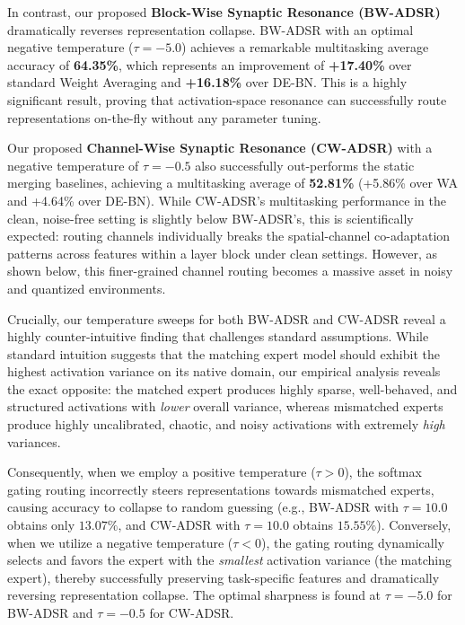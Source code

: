 \documentclass{article}
\theoremstyle{plain}
\theoremstyle{definition}
\theoremstyle{remark}
\begin{document}
In contrast, our proposed \textbf{Block-Wise Synaptic Resonance (BW-ADSR)} dramatically reverses representation collapse. BW-ADSR with an optimal negative temperature ($\tau = -5.0$) achieves a remarkable multitasking average accuracy of \textbf{64.35\%}, which represents an improvement of \textbf{+17.40\%} over standard Weight Averaging and \textbf{+16.18\%} over DE-BN. This is a highly significant result, proving that activation-space resonance can successfully route representations on-the-fly without any parameter tuning.

Our proposed \textbf{Channel-Wise Synaptic Resonance (CW-ADSR)} with a negative temperature of $\tau = -0.5$ also successfully out-performs the static merging baselines, achieving a multitasking average of \textbf{52.81\%} (+5.86\% over WA and +4.64\% over DE-BN). While CW-ADSR's multitasking performance in the clean, noise-free setting is slightly below BW-ADSR's, this is scientifically expected: routing channels individually breaks the spatial-channel co-adaptation patterns across features within a layer block under clean settings. However, as shown below, this finer-grained channel routing becomes a massive asset in noisy and quantized environments.

Crucially, our temperature sweeps for both BW-ADSR and CW-ADSR reveal a highly counter-intuitive finding that challenges standard assumptions. While standard intuition suggests that the matching expert model should exhibit the highest activation variance on its native domain, our empirical analysis reveals the exact opposite: the matched expert produces highly sparse, well-behaved, and structured activations with \emph{lower} overall variance, whereas mismatched experts produce highly uncalibrated, chaotic, and noisy activations with extremely \emph{high} variances.

Consequently, when we employ a positive temperature ($\tau > 0$), the softmax gating routing incorrectly steers representations towards mismatched experts, causing accuracy to collapse to random guessing (e.g., BW-ADSR with $\tau = 10.0$ obtains only $13.07\%$, and CW-ADSR with $\tau = 10.0$ obtains $15.55\%$). Conversely, when we utilize a negative temperature ($\tau < 0$), the gating routing dynamically selects and favors the expert with the \emph{smallest} activation variance (the matching expert), thereby successfully preserving task-specific features and dramatically reversing representation collapse. The optimal sharpness is found at $\tau = -5.0$ for BW-ADSR and $\tau = -0.5$ for CW-ADSR.
\end{document}
